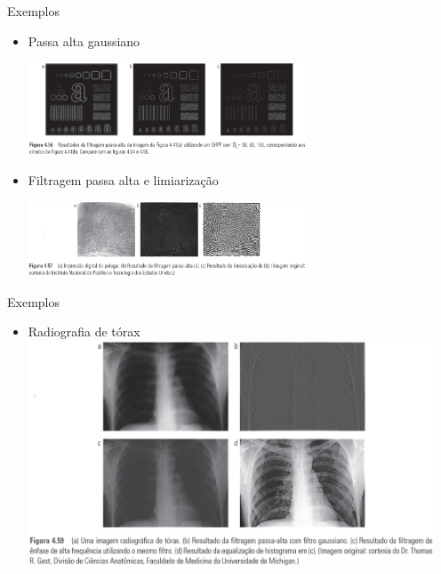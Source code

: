       \begin{slide}[toc=]{Exemplos}
         \begin{itemize}[type=1]
            \item Passa alta gaussiano
	      \begin{center}
            \includegraphics[width=0.65\textwidth]{figs/fig0456}
	      \end{center}
            \item Filtragem passa alta e limiarização
	      \begin{center}
            \includegraphics[width=0.65\textwidth]{figs/fig0457}
	      \end{center}
         \end{itemize}
      \end{slide}
      
      \begin{slide}[toc=]{Exemplos}
         \begin{itemize}[type=1]
            \item Radiografia de tórax
            \includegraphics[width=0.95\textwidth]{figs/fig0459}
         \end{itemize}
      \end{slide}
      
